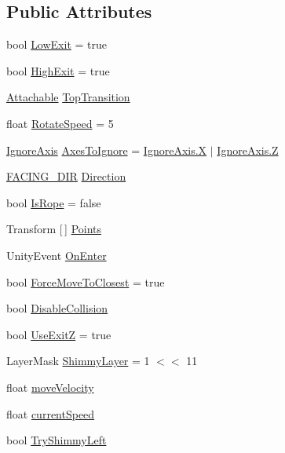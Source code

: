 \subsection*{Public Attributes}
\begin{DoxyCompactItemize}
\item 
bool \mbox{\hyperlink{class_ladder_object_aa466f4797dc3eb5c97f1b44861a23872}{Low\+Exit}} = true
\item 
bool \mbox{\hyperlink{class_ladder_object_a4ab6f84e191215d1c73ef980cf46ead2}{High\+Exit}} = true
\item 
\mbox{\hyperlink{class_attachable}{Attachable}} \mbox{\hyperlink{class_ladder_object_a8b3611b37cdc792abaf9ce4d825d42c7}{Top\+Transition}}
\item 
float \mbox{\hyperlink{class_ladder_object_a7fab140049f0d2a427a9778fff4553b3}{Rotate\+Speed}} = 5
\item 
\mbox{\hyperlink{_ignore_axis_8cs_aa61b0141055d583a4f5b013297a1d48f}{Ignore\+Axis}} \mbox{\hyperlink{class_ladder_object_acef7b0cbc039eea9e32cd5e56bbc9fae}{Axes\+To\+Ignore}} = \mbox{\hyperlink{_ignore_axis_8cs_aa61b0141055d583a4f5b013297a1d48fa02129bb861061d1a052c592e2dc6b383}{Ignore\+Axis.\+X}} $\vert$ \mbox{\hyperlink{_ignore_axis_8cs_aa61b0141055d583a4f5b013297a1d48fa21c2e59531c8710156d34a3c30ac81d5}{Ignore\+Axis.\+Z}}
\item 
\mbox{\hyperlink{_animal_8cs_a57d10208ebba781ae206546ada2002b6}{F\+A\+C\+I\+N\+G\+\_\+\+D\+IR}} \mbox{\hyperlink{class_ladder_object_a6f93daf035514b3c105c31a7a1351be7}{Direction}}
\item 
bool \mbox{\hyperlink{class_ladder_object_adb3c861b53e404aa95a11436fe23cde6}{Is\+Rope}} = false
\item 
Transform \mbox{[}$\,$\mbox{]} \mbox{\hyperlink{class_ladder_object_a6d87f62a0637a961b199cbc46947f268}{Points}}
\item 
Unity\+Event \mbox{\hyperlink{class_ladder_object_ab1104ffe4ebc8977633affb6c7e3fda6}{On\+Enter}}
\item 
bool \mbox{\hyperlink{class_ladder_object_a86fa41ca3666a9924efed8179d0a9107}{Force\+Move\+To\+Closest}} = true
\item 
bool \mbox{\hyperlink{class_ladder_object_a4ffcf3a6cc34dd6a74d0b0c72c06915f}{Disable\+Collision}}
\item 
bool \mbox{\hyperlink{class_ladder_object_ab54cdfaf922b790774eb7f689aac83df}{Use\+ExitZ}} = true
\item 
Layer\+Mask \mbox{\hyperlink{class_ladder_object_a4b023b52fe14507f89ceb8a051184536}{Shimmy\+Layer}} = 1 $<$$<$ 11
\item 
float \mbox{\hyperlink{class_ladder_object_a80845108cd678da40fc9519acdd5f9a4}{move\+Velocity}}
\item 
float \mbox{\hyperlink{class_ladder_object_acc99f7b844cc4eb9c9147a6bdf09f086}{current\+Speed}}
\item 
bool \mbox{\hyperlink{class_ladder_object_a2d1cd0321fb3ff25a0225edf53f2be3b}{Try\+Shimmy\+Left}}
\end{DoxyCompactItemize}
